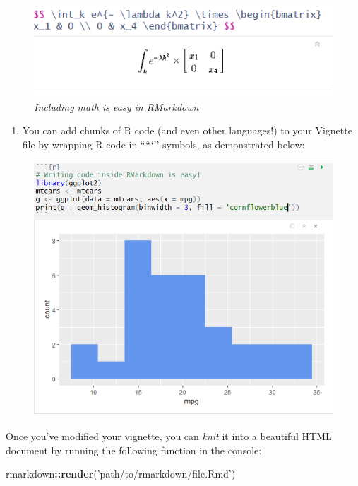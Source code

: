 \documentclass[]{book}
\newenvironment{Shaded}{\begin{snugshade}}{\end{snugshade}}
\newcommand{\KeywordTok}[1]{\textcolor[rgb]{0.13,0.29,0.53}{\textbf{#1}}}
\newcommand{\StringTok}[1]{\textcolor[rgb]{0.31,0.60,0.02}{#1}}
\newcommand{\OperatorTok}[1]{\textcolor[rgb]{0.81,0.36,0.00}{\textbf{#1}}}
\newcommand{\NormalTok}[1]{#1}
\providecommand{\tightlist}{%
  \setlength{\itemsep}{0pt}\setlength{\parskip}{0pt}}
\begin{document}
\begin{figure}
\centering
\includegraphics{images/packageSS/vignettemath.PNG}
\caption{\emph{Including math is easy in RMarkdown}}
\end{figure}

\begin{enumerate}
\def\labelenumi{\arabic{enumi}.}
\setcounter{enumi}{2}
\tightlist
\item
  You can add chunks of R code (and even other languages!) to your
  Vignette file by wrapping R code in `````'' symbols, as demonstrated
  below:
\end{enumerate}

\begin{figure}
\centering
\includegraphics{images/packageSS/vignettecode.PNG}
\caption{}
\end{figure}

Once you've modified your vignette, you can \emph{knit} it into a
beautiful HTML document by running the following function in the
console:

\begin{Shaded}
\begin{Highlighting}[]
\NormalTok{rmarkdown}\OperatorTok{::}\KeywordTok{render}\NormalTok{(}\StringTok{'path/to/rmarkdown/file.Rmd'}\NormalTok{)}
\end{Highlighting}
\end{Shaded}
\end{document}
